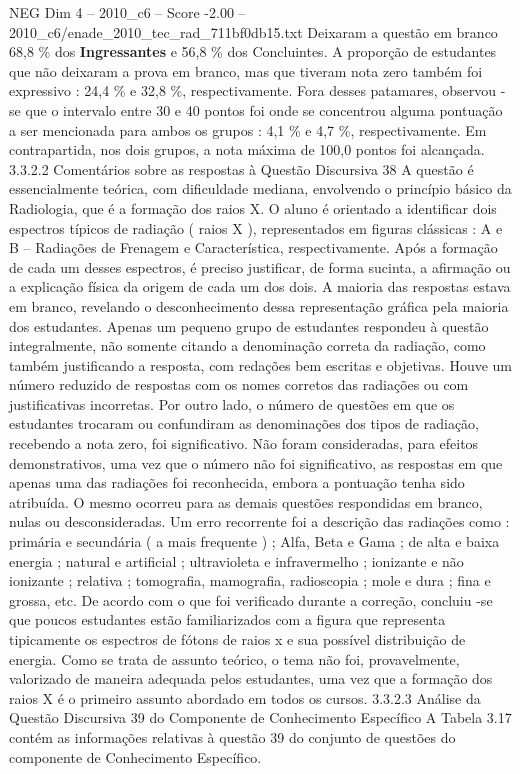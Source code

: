 \begin{textsample}{NEG Dim 4 – 2010\_c6 – Score -2.00 – 2010\_c6/enade\_2010\_tec\_rad\_711bf0db15.txt}
Deixaram a questão em branco 68,8 \% dos \textbf{Ingressantes} e 56,8 \% dos Concluintes.
A proporção de estudantes que não deixaram a prova em branco, mas que tiveram nota zero também foi expressivo : 24,4 \% e 32,8 \%, respectivamente.
Fora desses patamares, observou -se que o intervalo entre 30 e 40 pontos foi onde se concentrou alguma pontuação a ser mencionada para ambos os grupos : 4,1 \% e 4,7 \%, respectivamente.
Em contrapartida, nos dois grupos, a nota máxima de 100,0 pontos foi alcançada. 3.3.2.2 Comentários sobre as respostas à Questão Discursiva 38 A questão é essencialmente teórica, com dificuldade mediana, envolvendo o princípio básico da Radiologia, que é a formação dos raios X.
O aluno é orientado a identificar dois espectros típicos de radiação ( raios X ), representados em figuras clássicas : A e B – Radiações de Frenagem e Característica, respectivamente.
Após a formação de cada um desses espectros, é preciso justificar, de forma sucinta, a afirmação ou a explicação física da origem de cada um dos dois.
A maioria das respostas estava em branco, revelando o desconhecimento dessa representação gráfica pela maioria dos estudantes.
Apenas um pequeno grupo de estudantes respondeu à questão integralmente, não somente citando a denominação correta da radiação, como também justificando a resposta, com redações bem escritas e objetivas.
Houve um número reduzido de respostas com os nomes corretos das radiações ou com justificativas incorretas.
Por outro lado, o número de questões em que os estudantes trocaram ou confundiram as denominações dos tipos de radiação, recebendo a nota zero, foi significativo.
Não foram consideradas, para efeitos demonstrativos, uma vez que o número não foi significativo, as respostas em que apenas uma das radiações foi reconhecida, embora a pontuação tenha sido atribuída.
O mesmo ocorreu para as demais questões respondidas em branco, nulas ou desconsideradas.
Um erro recorrente foi a descrição das radiações como : primária e secundária ( a mais frequente ) ; Alfa, Beta e Gama ; de alta e baixa energia ; natural e artificial ; ultravioleta e infravermelho ; ionizante e não ionizante ; relativa ; tomografia, mamografia, radioscopia ; mole e dura ; fina e grossa, etc.
De acordo com o que foi verificado durante a correção, concluiu -se que poucos estudantes estão familiarizados com a figura que representa tipicamente os espectros de fótons de raios x e sua possível distribuição de energia.
Como se trata de assunto teórico, o tema não foi, provavelmente, valorizado de maneira adequada pelos estudantes, uma vez que a formação dos raios X é o primeiro assunto abordado em todos os cursos. 3.3.2.3 Análise da Questão Discursiva 39 do Componente de Conhecimento Específico A Tabela 3.17 contém as informações relativas à questão 39 do conjunto de questões do componente de Conhecimento Específico.

\end{textsample}
